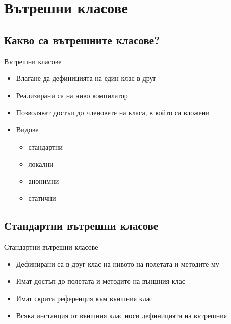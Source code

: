 \documentclass{beamer}
\begin{document}
\section{Вътрешни класове}
\subsection{Какво са вътрешните класове?}
\begin{frame}{Вътрешни класове}
  \transdissolve
  \begin{itemize}
  \item Влагане да дефиницията на един клас в друг \pause
  \item Реализирани са на ниво компилатор \pause
  \item Позволяват достъп до членовете на класа, в който са вложени \pause
  \item Видове \pause
    \begin{itemize}
      \item стандартни \pause
      \item локални  \pause
      \item анонимни \pause
      \item статични \pause
    \end{itemize}
  \end{itemize}
\end{frame}

\subsection{Стандартни вътрешни класове}
\begin{frame}{Стандартни вътрешни класове}
  \transdissolve
  \begin{itemize}
  \item Дефинирани са в друг клас на нивото на полетата и методите му \pause
  \item Имат достъп до полетата и методите на външния клас \pause
  \item Имат скрита референция към външния клас \pause
  \item Всяка инстанция от външния клас носи дефиницията на вътрешния
  \end{itemize}
\end{frame}
\end{document}
